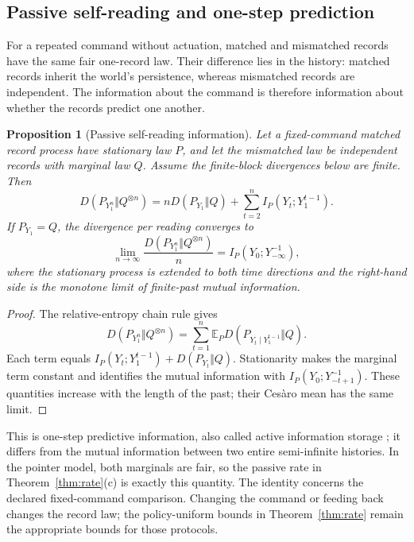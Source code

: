 \documentclass[11pt,a4paper]{article}
\newtheorem{proposition}[definition]{Proposition}
\newcommand{\E}{\mathbb E}
\begin{document}
\subsection{Passive self-reading and one-step prediction}\label{subsec:predinfo}

For a repeated command without actuation, matched and mismatched records have
the same fair one-record law. Their difference lies in the history: matched
records inherit the world's persistence, whereas mismatched records are
independent. The information about the command is therefore information
about whether the records predict one another.

\begin{proposition}[Passive self-reading information]\label{prop:predinfo}
Let a fixed-command matched record process have stationary law $P$, and let
the mismatched law be independent records with marginal law $Q$. Assume the
finite-block divergences below are finite. Then
\begin{equation}\label{eq:predinfo}
 D(P_{Y_1^n}\Vert Q^{\otimes n})
 =nD(P_{Y_1}\Vert Q)+\sum_{t=2}^n I_P(Y_t;Y_1^{t-1}).
\end{equation}
If $P_{Y_1}=Q$, the divergence per reading converges to
\[
 \lim_{n\to\infty}\frac{D(P_{Y_1^n}\Vert Q^{\otimes n})}{n}
 =I_P(Y_0;Y_{-\infty}^{-1}),
\]
where the stationary process is extended to both time directions and the
right-hand side is the monotone limit of finite-past mutual information.
\end{proposition}
\begin{proof}
The relative-entropy chain rule gives
\[
 D(P_{Y_1^n}\Vert Q^{\otimes n})
 =\sum_{t=1}^n\E_P D(P_{Y_t\mid Y_1^{t-1}}\Vert Q).
\]
Each term equals $I_P(Y_t;Y_1^{t-1})+D(P_{Y_t}\Vert Q)$.
Stationarity makes the marginal term constant and identifies the mutual
information with $I_P(Y_0;Y_{-t+1}^{-1})$. These quantities increase with
the length of the past; their Ces\`aro mean has the same limit.
\end{proof}

This is one-step predictive information, also called active information
storage \cite{Bialek2001,Wibral2014}; it differs from the mutual information
between two entire semi-infinite histories. In the pointer model, both
marginals are fair, so the passive rate in Theorem~\ref{thm:rate}(c) is
exactly this quantity. The identity concerns the declared fixed-command
comparison. Changing the command or feeding back changes the record law;
the policy-uniform bounds in Theorem~\ref{thm:rate} remain the appropriate
bounds for those protocols.
\end{document}
